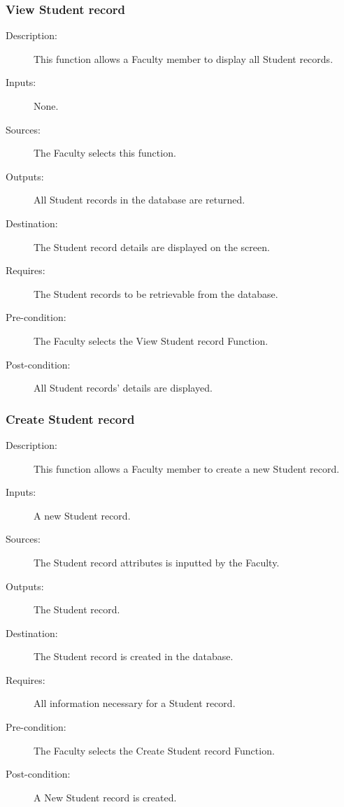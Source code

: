 \subsubsection{\large View Student record} 
\begin{boxed} %
\begin{description}
\item[Description:]
   This function allows a Faculty member to display all Student records.
\item[Inputs:]
   None.
\item[Sources:]
   The Faculty selects this function.
\item[Outputs:]
   All Student records in the database are returned.
\item[Destination:]
   The Student record details are displayed on the screen.
\item[Requires:]
   The Student records to be retrievable from the database.
\item[Pre-condition:]
   The Faculty selects the View Student record Function.
\item[Post-condition:]
   All Student records' details are displayed.
\end{description}
\end{boxed} %

\subsubsection{\large Create Student record} 
\begin{boxed} %
\begin{description}
\item[Description:]
   This function allows a Faculty member to create a new Student record.
\item[Inputs:]
   A new Student record.
\item[Sources:]
   The Student record attributes is inputted by the Faculty.
\item[Outputs:]
   The Student record.
\item[Destination:]
   The Student record is created in the database.
\item[Requires:]
   All information necessary for a Student record.
\item[Pre-condition:]
   The Faculty selects the Create Student record Function.
\item[Post-condition:]
   A New Student record is created.
\end{description}
\end{boxed} %

